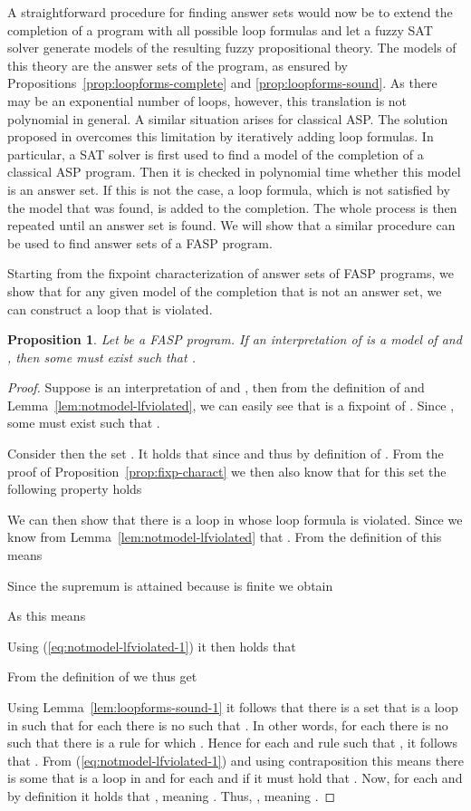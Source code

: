 \documentclass{tlp}
\newtheorem{proposition}{Proposition}
\begin{document}
A straightforward procedure for finding answer sets would now be to extend the completion of a program with all possible loop formulas and let a fuzzy SAT solver generate models of the resulting fuzzy propositional theory. The models of this theory are the answer sets of the program, as ensured by Propositions~\ref{prop:loopforms-complete} and \ref{prop:loopforms-sound}. As there may be an exponential number of loops, however, this translation is not polynomial in general. A similar situation arises for classical ASP. The solution proposed in \cite{assat-linzhao} overcomes this limitation by iteratively adding loop formulas. In particular, a SAT solver is first used to find a model of the completion of a classical ASP program. Then it is checked in polynomial time whether this model is an answer set. If this is not the case, a loop formula, which is not satisfied by the model that was found, is added to the completion. The whole process is then repeated until an answer set is found. We will show that a similar procedure can be used to find answer sets of a FASP program.  

Starting from the fixpoint characterization of answer sets of FASP programs, we show that for any given model of the completion that is not an answer set, we can construct a loop that is violated.

\begin{proposition}\label{prop:notmodel-lfviolated}
 Let  be a FASP program. If an interpretation  of  is a model of  and , then some  must exist such that .
\end{proposition}
\begin{proof}
 Suppose  is an interpretation of  and , then from the definition of  and Lemma~\ref{lem:notmodel-lfviolated}, we can easily see that  is a fixpoint of . Since , some  must exist such that .
 
 Consider then the set . It holds that  since  and thus  by definition of . From the proof of Proposition~\ref{prop:fixp-charact} we then also know that for this set  the following property holds
  
 We can then show that there is a loop in  whose loop formula is violated. Since  we know from Lemma~\ref{lem:notmodel-lfviolated} that . From the definition of  this means
  
 Since the supremum is attained because  is finite we obtain
  
 As  this means
  
 Using (\ref{eq:notmodel-lfviolated-1}) it then holds that
   
  From the definition of  we thus get
   
  Using Lemma~\ref{lem:loopforms-sound-1} it follows that there is a set  that is a loop in  such that for each  there is no  such that . In other words, for each  there is no  such that there is a rule  for which . Hence for each  and rule  such that , it follows that .
  From (\ref{eq:notmodel-lfviolated-1}) and using contraposition this means there is some  that is a loop in  and for each  and  if  it must hold that .
  Now, for each  and  by definition it holds that , meaning . Thus, , meaning .
\end{proof}
\end{document}
